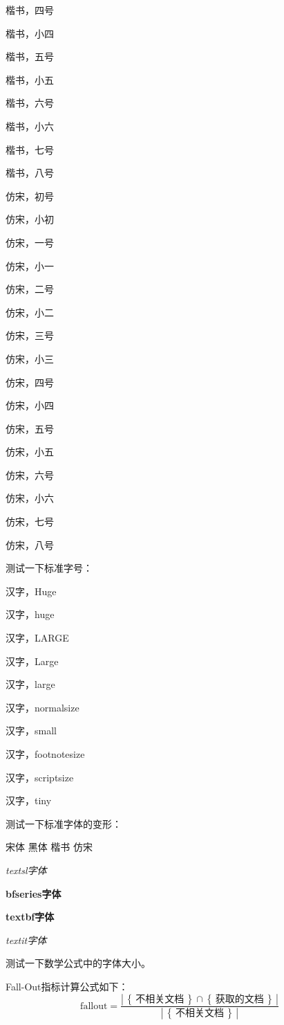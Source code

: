 {\kaishu{} 楷书，四号}

{\kaishu{} 楷书，小四}

{\kaishu{} 楷书，五号}

{\kaishu{} 楷书，小五}

{\kaishu{} 楷书，六号}

{\kaishu{} 楷书，小六}

{\kaishu{} 楷书，七号}

{\kaishu{} 楷书，八号}

{\fangsong{} 仿宋，初号}

{\fangsong{} 仿宋，小初}

{\fangsong{} 仿宋，一号}

{\fangsong{} 仿宋，小一}

{\fangsong{} 仿宋，二号}

{\fangsong{} 仿宋，小二}

{\fangsong{} 仿宋，三号}

{\fangsong{} 仿宋，小三}

{\fangsong{} 仿宋，四号}

{\fangsong{} 仿宋，小四}

{\fangsong{} 仿宋，五号}

{\fangsong{} 仿宋，小五}

{\fangsong{} 仿宋，六号}

{\fangsong{} 仿宋，小六}

{\fangsong{} 仿宋，七号}

{\fangsong{} 仿宋，八号}

测试一下标准字号：

{\Huge 汉字，Huge}

{\huge 汉字，huge}

{\LARGE 汉字，LARGE}

{\Large 汉字，Large}

{\large 汉字，large}

{\normalsize 汉字，normalsize}

{\small 汉字，small}

{\footnotesize 汉字，footnotesize}

{\scriptsize 汉字，scriptsize}

{\tiny 汉字，tiny}

测试一下标准字体的变形：

{\songti 宋体} {\heiti 黑体} {\kaishu 楷书} {\fangsong 仿宋}

{\textsl{textsl字体}}

{\bfseries bfseries字体}

{\textbf{textbf字体}}

{\textit{textit字体}}

测试一下数学公式中的字体大小。

\newcommand{\set}[1]{\left\{\,#1\,\right\}}
\newcommand{\card}[1]{\left|\,#1\,\right|}

Fall-Out指标计算公式如下：
\begin{equation*}
\mbox{fallout} = \frac{\card{\set{\text{不相关文档}}\cap\set{\text{获取的文档}}}}{\card{\set{\text{不相关文档}}}}
\end{equation*}